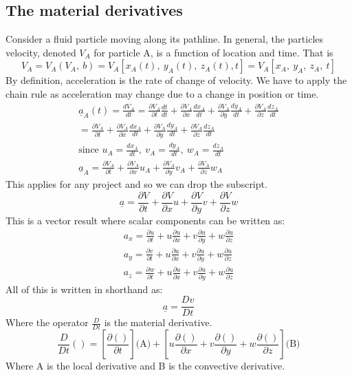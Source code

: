 \subsection{The material derivatives}
Consider a fluid particle moving along its pathline. In general, the particles velocity, denoted \(V_A\) for particle A, is a function of location and time. That is
\begin{equation}
  V_A = V_A(V_A, \ b) = V_A \left[ x_A(t), \ y_A(t), \ z_A(t), t \right] = V_A \left[ x_A, \ y_A, \ z_A,\  t \right]
\end{equation}
By definition, acceleration is the rate of change of velocity. We have to apply the chain rule as acceleration may change due to a change in position or time.
\begin{gather}
  \underline{a}_A(t) = \frac{dV_A}{dt} = \frac{\partial V_A}{\partial t} \frac{dt}{dt} + \frac{\partial V_A}{\partial x} \frac{dx_A}{dt} + \frac{\partial V_A}{\partial y} \frac{dy_A}{dt} + \frac{\partial V_A}{\partial z} \frac{dz_A}{dt} \\
  = \frac{\partial V_A}{\partial t} + \frac{\partial V_A}{\partial x} \frac{dx_A}{dt} + \frac{\partial V_A}{\partial y} \frac{dy_A}{dt} + \frac{\partial V_A}{\partial z} \frac{dz_A}{dt} \\
  \textrm{since } u_A = \frac{dx_A}{dt}, \ v_A = \frac{dy_A}{dt}, \ w_A = \frac{dz_A}{dt} \\
  \underline{a}_A = \frac{\partial V_A}{\partial t} + \frac{\partial V_A}{\partial x} u_A + \frac{\partial V_A}{\partial y} v_A + \frac{\partial V_A}{\partial z} w_A
\end{gather}
This applies for any project and so we can drop the subscript.
\begin{equation}
  \underline{a} = \frac{\partial V}{\partial t} + \frac{\partial V}{\partial x} u + \frac{\partial V}{\partial y} v + \frac{\partial V}{\partial z} w
\end{equation}
This is a vector result where scalar components can be written as:
\begin{gather}
  a_x = \frac{\partial u}{\partial t} + u\frac{\partial u}{\partial x} + v\frac{\partial u}{\partial y} + w\frac{\partial u}{\partial z} \\
  a_y = \frac{\partial v}{\partial t} + u\frac{\partial u}{\partial x} + v\frac{\partial u}{\partial y} + w\frac{\partial u}{\partial z} \\
  a_z = \frac{\partial w}{\partial t} + u\frac{\partial u}{\partial x} + v\frac{\partial u}{\partial y} + w\frac{\partial u}{\partial z}
\end{gather}
All of this is written in shorthand as:
\begin{equation}
  \underline{a} = \frac{Dv}{Dt}
\end{equation}
Where the operator \( \frac{D}{Dt}\) is the material derivative.
\begin{equation}
  \frac{D}{Dt}() = \left[\frac{\partial ()}{\partial t} \right] \textrm{(A)} + \left[u\frac{\partial ()}{\partial x} + v\frac{\partial ()}{\partial y} + w\frac{\partial ()}{\partial z} \right] \textrm{(B)}
\end{equation}
Where A is the local derivative and B is the convective derivative.

